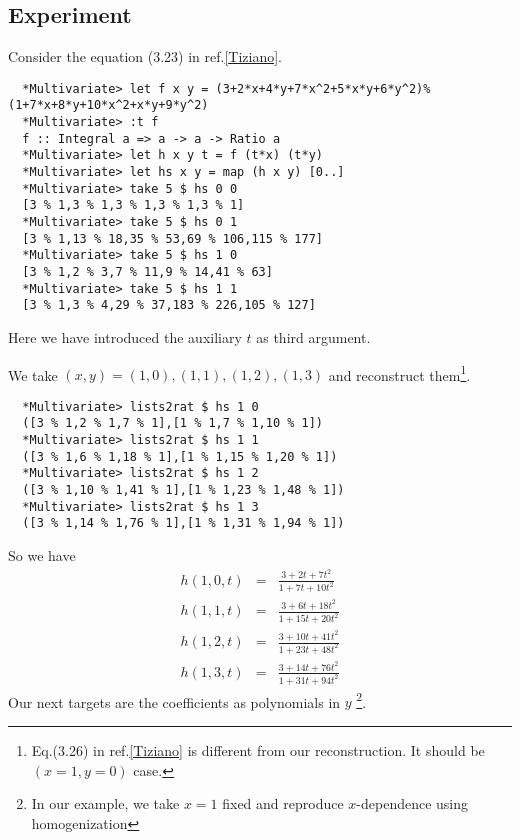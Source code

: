 \documentclass[11pt]{book}
\begin{document}
\subsection{Experiment}
Consider the equation (3.23) in ref.\ref{Tiziano}.
\begin{verbatim}
  *Multivariate> let f x y = (3+2*x+4*y+7*x^2+5*x*y+6*y^2)%(1+7*x+8*y+10*x^2+x*y+9*y^2)
  *Multivariate> :t f
  f :: Integral a => a -> a -> Ratio a
  *Multivariate> let h x y t = f (t*x) (t*y)
  *Multivariate> let hs x y = map (h x y) [0..]
  *Multivariate> take 5 $ hs 0 0
  [3 % 1,3 % 1,3 % 1,3 % 1,3 % 1]
  *Multivariate> take 5 $ hs 0 1
  [3 % 1,13 % 18,35 % 53,69 % 106,115 % 177]
  *Multivariate> take 5 $ hs 1 0
  [3 % 1,2 % 3,7 % 11,9 % 14,41 % 63]
  *Multivariate> take 5 $ hs 1 1
  [3 % 1,3 % 4,29 % 37,183 % 226,105 % 127]
\end{verbatim}
Here we have introduced the auxiliary $t$ as third argument.

We take $(x,y) = (1,0), (1,1), (1,2), (1,3)$ and reconstruct them\footnote{Eq.(3.26) in ref.\ref{Tiziano} is different from our reconstruction.
It should be $(x=1, y=0)$ case.
}.
\begin{verbatim}
  *Multivariate> lists2rat $ hs 1 0
  ([3 % 1,2 % 1,7 % 1],[1 % 1,7 % 1,10 % 1])
  *Multivariate> lists2rat $ hs 1 1
  ([3 % 1,6 % 1,18 % 1],[1 % 1,15 % 1,20 % 1])
  *Multivariate> lists2rat $ hs 1 2
  ([3 % 1,10 % 1,41 % 1],[1 % 1,23 % 1,48 % 1])
  *Multivariate> lists2rat $ hs 1 3
  ([3 % 1,14 % 1,76 % 1],[1 % 1,31 % 1,94 % 1])
\end{verbatim}
So we have
\begin{eqnarray}
h(1,0,t) &=& \frac{3+2t+7t^2}{1+7t+10t^2} \\
h(1,1,t) &=& \frac{3+6t+18t^2}{1+15t+20t^2} \\
h(1,2,t) &=& \frac{3+10t+41t^2}{1+23t+48t^2} \\
h(1,3,t) &=& \frac{3+14t+76t^2}{1+31t+94t^2}
\end{eqnarray}
Our next targets are the coefficients as polynomials in $y$ \footnote{
In our example, we take $x=1$ fixed and reproduce $x$-dependence using homogenization
}.
\end{document}
